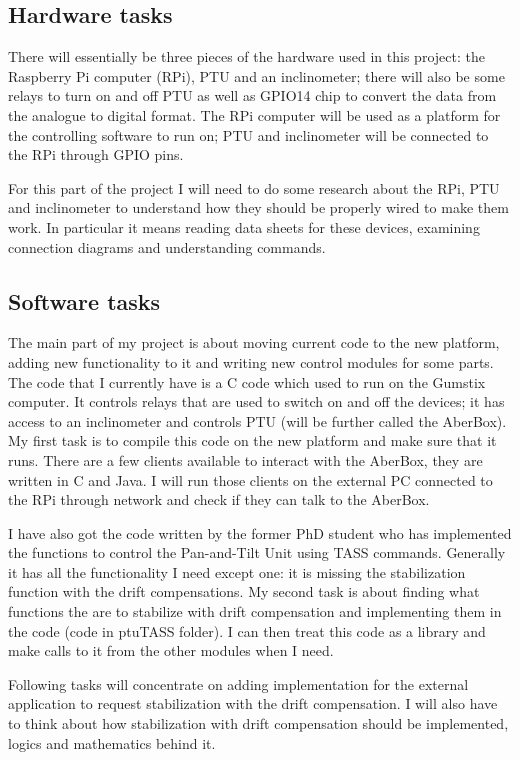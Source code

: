 \documentclass[11pt,fleqn,twoside]{article}
\begin{document}
\subsection{Hardware tasks}
There will essentially be three pieces of the hardware used in this project: the Raspberry Pi computer (RPi), PTU and an inclinometer; there will also be some relays to turn on and off PTU as well as GPIO14 chip to convert the data from the analogue to digital format. The RPi computer will be used as a platform for the controlling software to run on; PTU and inclinometer will be connected to the RPi through GPIO pins. 

For this part of the project I will need to do some research about the RPi, PTU and inclinometer to understand how they should be properly wired to make them work. In particular it means reading data sheets for these devices, examining connection diagrams and understanding commands.

\subsection{Software tasks}
The main part of my project is about moving current code to the new platform, adding new functionality to it and writing new control modules for some parts. The code that I currently have is a C code which used to run on the Gumstix computer. It controls relays that are used to switch on and off the devices; it has access to an inclinometer and controls PTU (will be further called the AberBox). My first task is to compile this code on the new platform and make sure that it runs. There are a few clients available to interact with the AberBox, they are written in C and Java. I will run those clients on the external PC connected to the RPi through network and check if they can talk to the AberBox.  

I have also got the code written by the former PhD student who has implemented the functions to control the Pan-and-Tilt Unit using TASS commands. Generally it has all the functionality I need except one: it is missing the stabilization function with the drift compensations. My second task is about finding what functions the are to stabilize with drift compensation and implementing them in the code (code in ptuTASS folder). I can then treat this code as a library and make calls to it from the other modules when I need.

Following tasks will concentrate on adding implementation for the external application to request stabilization with the drift compensation. I will also have to think about how stabilization with drift compensation should be implemented, logics and mathematics behind it.
\end{document}
